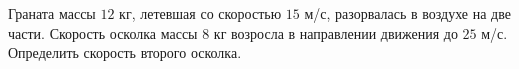 Граната массы $12$ кг, летевшая со скоростью $15$ м/с, разорвалась в воздухе на две части. 
Скорость осколка массы $8$ кг возросла в направлении движения до $25$ м/с. 
Определить скорость второго осколка.
